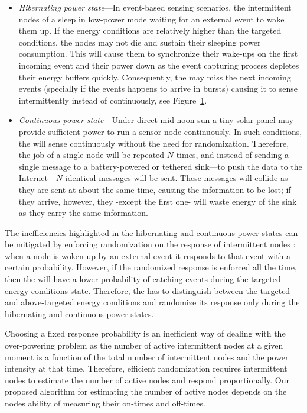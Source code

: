\begin{itemize}
\begin{figure}
		\label{fig:noRand}
\end{figure} 
%
		\item \label{it:hibernating} \textit{Hibernating power state}---In event-based sensing scenarios, the intermittent nodes of a \sys sleep in low-power mode waiting for an external event to wake them up. If the energy conditions are relatively higher than the targeted conditions, the nodes may not die and sustain their sleeping power consumption. This will cause them to synchronize their wake-ups on the first incoming event and their power down as the event capturing process depletes their energy buffers quickly. Consequently, the \sys may miss the next incoming events (specially if the events happens to arrive in bursts) causing it to sense intermittently instead of continuously, see Figure~\ref{fig:noRand}. 
		\item \label{it:continuous} \textit{Continuous power state}---Under direct mid-noon sun a tiny solar panel may provide sufficient power to run a sensor node continuously. In such conditions, the \sys will sense continuously without the need for randomization. Therefore, the job of a single node will be repeated $N$ times, and instead of sending a single message to a battery-powered or tethered sink---to push the data to the Internet---$N$ identical messages will be sent.
		These messages will collide as they are sent at about the same time, causing the information to be lost; if they arrive, however, they -except the first one- will waste energy of the sink as they carry the same information.  
				
\end{itemize}
%
The inefficiencies highlighted in the hibernating and continuous power states can be mitigated by enforcing randomization on the response of intermittent nodes 
: when a node is woken up by an external event it responds to that event with a certain probability. However, if the randomized response is enforced all the time, then the \sys will have a lower probability of catching events during the targeted energy conditions state. Therefore, the \sys has to distinguish between the targeted and above-targeted energy conditions and randomize its response only during the hibernating and continuous power states. 

Choosing a fixed response probability is an inefficient way of dealing with the over-powering problem as the number of active intermittent nodes at a given moment is a function of the total number of intermittent nodes and the power intensity at that time. Therefore, efficient randomization requires intermittent nodes to estimate the number of active nodes and respond proportionally. Our proposed algorithm for estimating the number of active nodes depends on the nodes ability of measuring their on-times and off-times.

